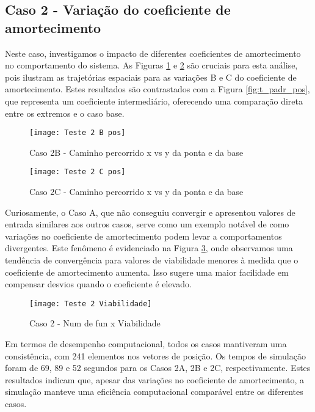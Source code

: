 \subsection{Caso 2 - Variação do coeficiente de amortecimento}
Neste caso, investigamos o impacto de diferentes coeficientes de amortecimento no comportamento do sistema. As Figuras \ref{fig:t_2b_pos} e \ref{fig:t_2c_pos} são cruciais para esta análise, pois ilustram as trajetórias espaciais para as variações B e C do coeficiente de amortecimento. Estes resultados são contrastados com a Figura \ref{fig:t_padr_pos}, que representa um coeficiente intermediário, oferecendo uma comparação direta entre os extremos e o caso base.

\begin{figure}[H]
    \begin{center}
    \caption{Caso 2B - Caminho percorrido x vs y da ponta e da base}
    \texttt{[image: Teste 2 B pos]}
    \label{fig:t_2b_pos}
    \end{center}
\end{figure}

\begin{figure}[H]
    \begin{center}
    \caption{Caso 2C - Caminho percorrido x vs y da ponta e da base}
    \texttt{[image: Teste 2 C pos]}
    \label{fig:t_2c_pos}
    \end{center}
\end{figure}

Curiosamente, o Caso A, que não conseguiu convergir e apresentou valores de entrada similares aos outros casos, serve como um exemplo notável de como variações no coeficiente de amortecimento podem levar a comportamentos divergentes. Este fenômeno é evidenciado na Figura \ref{fig:t_2_viab}, onde observamos uma tendência de convergência para valores de viabilidade menores à medida que o coeficiente de amortecimento aumenta. Isso sugere uma maior facilidade em compensar desvios quando o coeficiente é elevado.

\begin{figure}[H]
    \begin{center}
    \caption{Caso 2 - Num de fun x Viabilidade}
    \texttt{[image: Teste 2 Viabilidade]}
    \label{fig:t_2_viab}
    \end{center}
\end{figure}

Em termos de desempenho computacional, todos os casos mantiveram uma consistência, com 241 elementos nos vetores de posição. Os tempos de simulação foram de 69, 89 e 52 segundos para os Casos 2A, 2B e 2C, respectivamente. Estes resultados indicam que, apesar das variações no coeficiente de amortecimento, a simulação manteve uma eficiência computacional comparável entre os diferentes casos.

